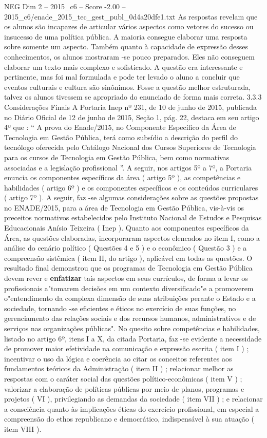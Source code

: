 \begin{textsample}{NEG Dim 2 – 2015\_c6 – Score -2.00 – 2015\_c6/enade\_2015\_tec\_gest\_publ\_0d4a20dfe1.txt}
As respostas revelam que os alunos são incapazes de articular vários aspectos como vetores do sucesso ou insucesso de uma política pública.
A maioria consegue elaborar uma resposta sobre somente um aspecto.
Também quanto à capacidade de expressão desses conhecimentos, os alunos mostraram -se pouco preparados.
Eles não conseguem elaborar um texto mais complexo e sofisticado.
A questão era interessante e pertinente, mas foi mal formulada e pode ter levado o aluno a concluir que eventos culturais e cultura são sinônimos.
Fosse a questão melhor estruturada, talvez os alunos tivessem se apropriado do enunciado de forma mais correta. 3.3.3 Considerações Finais A Portaria Inep nº 231, de 10 de junho de 2015, publicada no Diário Oficial de 12 de junho de 2015, Seção 1, pág. 22, destaca em seu artigo 4º que : “ A prova do Enade/2015, no Componente Específico da Área de Tecnologia em Gestão Pública, terá como subsídio a descrição do perfil do tecnólogo oferecida pelo Catálogo Nacional dos Cursos Superiores de Tecnologia para os cursos de Tecnologia em Gestão Pública, bem como normativas associadas e a legislação profissional ”.
A seguir, nos artigos 5º a 7º, a Portaria enuncia os componentes específicos da área ( artigo 5º ), as competências e habilidades ( artigo 6º ) e os componentes específicos e os conteúdos curriculares ( artigo 7º ).
A seguir, faz -se algumas considerações sobre as questões propostas no ENADE/2015, para a área de Tecnologia em Gestão Pública, vis-à-vis os preceitos normativos estabelecidos pelo Instituto Nacional de Estudos e Pesquisas Educacionais Anísio Teixeira ( Inep ).
Quanto aos componentes específicos da Área, as questões elaboradas, incorporaram aspectos elencados no item I, como a análise do cenário político ( Questões 4 e 5 ) e o econômico ( Questão 3 ) e a compreensão sistêmica ( item II, do artigo ), aplicável em todas as questões.
O resultado final demonstrou que os programas de Tecnologia em Gestão Pública devem rever e \textbf{enfatizar} tais aspectos em seus currículos, de forma a levar os profissionais a"tomarem decisões em um contexto diversificado"e a promoverem o"entendimento da complexa dimensão de suas atribuições perante o Estado e a sociedade, tornando -se eficientes e éticos no exercício de suas funções, no gerenciamento das relações sociais e dos recursos humanos, administrativos e de serviços nas organizações públicas".
No quesito sobre competências e habilidades, listado no artigo 6º, itens I a X, da citada Portaria, faz -se evidente a necessidade de promover maior efetividade na comunicação e expressão escrita ( item I ) ; incentivar o uso da lógica e coerência ao citar os conceitos referentes aos fundamentos teóricos da Administração ( item II ) ; relacionar melhor as respostas com o caráter social das questões político-econômicas ( item V ) ; valorizar a elaboração de políticas públicas por meio de planos, programas e projetos ( VI ), privilegiando as demandas da sociedade ( item VII ) ; e relacionar a consciência quanto às implicações éticas do exercício profissional, em especial a compreensão do ethos republicano e democrático, indispensável à sua atuação ( item VIII ).

\end{textsample}
